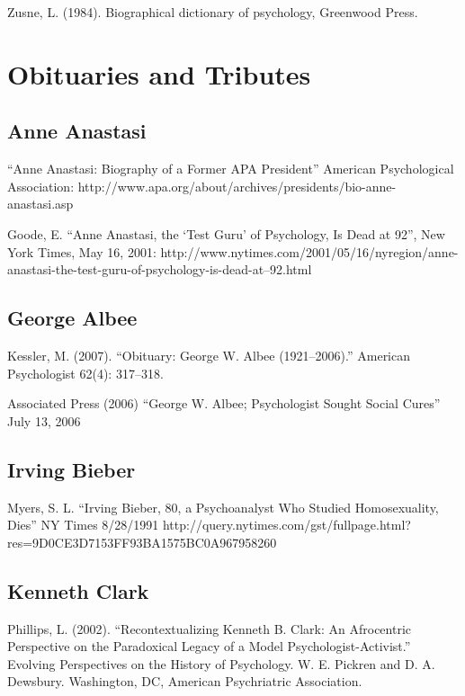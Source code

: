 Zusne, L. (1984). Biographical dictionary of psychology, Greenwood Press.

\section{Obituaries and Tributes}
\label{obituariesandtributes}

\subsection{Anne Anastasi}
\label{anneanastasi}

“Anne Anastasi: Biography of a Former APA President” American Psychological Association: http:\slash \slash www.apa.org\slash about\slash archives\slash presidents\slash bio-anne-anastasi.asp

Goode, E. “Anne Anastasi, the `Test Guru' of Psychology, Is Dead at 92”, New York Times, May 16, 2001: http:\slash \slash www.nytimes.com\slash 2001\slash 05\slash 16\slash nyregion\slash anne-anastasi-the-test-guru-of-psychology-is-dead-at--92.html 

\subsection{George Albee}
\label{georgealbee}

Kessler, M. (2007). ``Obituary: George W. Albee (1921--2006).'' American Psychologist 62(4): 317--318. 

Associated Press (2006) “George W. Albee; Psychologist Sought Social Cures” July 13, 2006

\subsection{Irving Bieber}
\label{irvingbieber}

Myers, S. L. “Irving Bieber, 80, a Psychoanalyst Who Studied Homosexuality, Dies” NY Times 8\slash 28\slash 1991 http:\slash \slash query.nytimes.com\slash gst\slash fullpage.html?res=9D0CE3D7153FF93BA1575BC0A967958260

\subsection{Kenneth Clark}
\label{kennethclark}

Phillips, L. (2002). “Recontextualizing Kenneth B. Clark: An Afrocentric Perspective on the Paradoxical Legacy of a Model Psychologist-Activist.” Evolving Perspectives on the History of Psychology. W. E. Pickren and D. A. Dewsbury. Washington, DC, American Psychriatric Association. 

